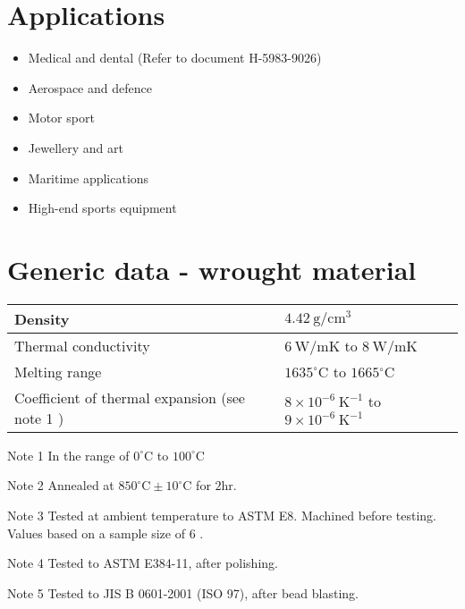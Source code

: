 \documentclass[10pt]{article}
\begin{document}
\section*{Applications}
\begin{itemize}
  \item Medical and dental (Refer to document H-5983-9026)

  \item Aerospace and defence

  \item Motor sport

  \item Jewellery and art

  \item Maritime applications

  \item High-end sports equipment

\end{itemize}

\section*{Generic data - wrought material}
\begin{center}
\begin{tabular}{|l|l|}
\hline
Density & $4.42 \mathrm{~g} / \mathrm{cm}^{3}$ \\
\hline
Thermal conductivity & $6 \mathrm{~W} / \mathrm{mK}$ to $8 \mathrm{~W} / \mathrm{mK}$ \\
\hline
Melting range & $1635^{\circ} \mathrm{C}$ to $1665{ }^{\circ} \mathrm{C}$ \\
\hline
Coefficient of thermal expansion (see note 1 ) & $8 \times 10^{-6} \mathrm{~K}^{-1}$ to $9 \times 10^{-6} \mathrm{~K}^{-1}$ \\
\hline
\end{tabular}
\end{center}

Note 1 In the range of $0^{\circ} \mathrm{C}$ to $100^{\circ} \mathrm{C}$

Note 2 Annealed at $850^{\circ} \mathrm{C} \pm 10^{\circ} \mathrm{C}$ for $2 \mathrm{hr}$.

Note 3 Tested at ambient temperature to ASTM E8. Machined before testing. Values based on a sample size of 6 .

Note 4 Tested to ASTM E384-11, after polishing.

Note 5 Tested to JIS B 0601-2001 (ISO 97), after bead blasting.
\end{document}
